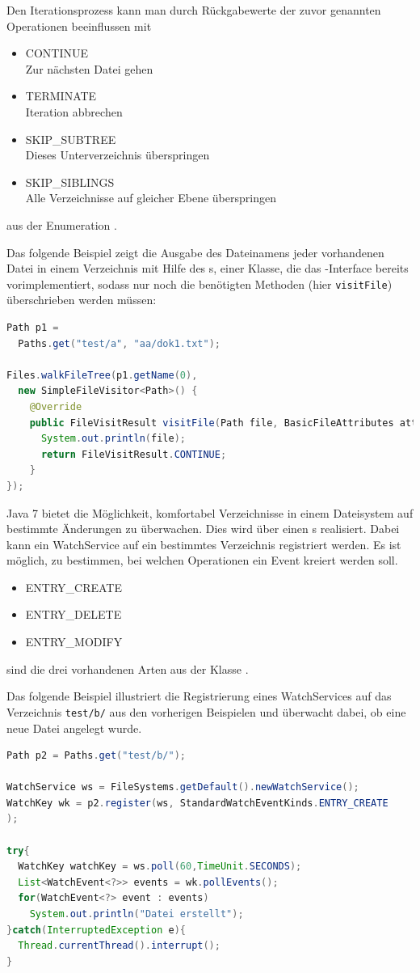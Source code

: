 \documentclass[times, 10pt,twocolumn]{article}
\begin{document}
Den Iterationsprozess kann man durch Rückgabewerte der zuvor genannten Operationen beeinflussen mit
\begin{itemize}
  \item CONTINUE\\
  Zur nächsten Datei gehen
  \item TERMINATE\\
  Iteration abbrechen
  \item SKIP\_SUBTREE\\
  Dieses Unterverzeichnis überspringen
  \item SKIP\_SIBLINGS\\
  Alle Verzeichnisse auf gleicher Ebene überspringen
\end{itemize}
aus der Enumeration .

Das folgende Beispiel zeigt die Ausgabe des Dateinamens jeder vorhandenen Datei in einem Verzeichnis mit Hilfe des
s, einer Klasse, die das -Interface bereits vorimplementiert, sodass nur noch die
benötigten Methoden (hier \texttt{visitFile}) überschrieben werden müssen:
\begin{lstlisting}[language=java,breaklines=true]
Path p1 = 
  Paths.get("test/a", "aa/dok1.txt");

Files.walkFileTree(p1.getName(0), 
  new SimpleFileVisitor<Path>() {
	@Override
	public FileVisitResult visitFile(Path file, BasicFileAttributes attrs) throws IOException {
      System.out.println(file);
      return FileVisitResult.CONTINUE;
	}
});
\end{lstlisting}

Java 7 bietet die Möglichkeit, komfortabel Verzeichnisse in einem Dateisystem auf bestimmte Änderungen zu überwachen.
Dies wird über einen s realisiert. Dabei kann ein WatchService auf ein bestimmtes Verzeichnis registriert
werden. Es ist möglich, zu bestimmen, bei welchen Operationen ein Event kreiert werden soll.
\begin{itemize}
  \item ENTRY\_CREATE
  \item ENTRY\_DELETE
  \item ENTRY\_MODIFY
\end{itemize}
sind die drei vorhandenen Arten aus der Klasse .

Das folgende Beispiel illustriert die Registrierung eines WatchServices auf das Verzeichnis \texttt{test/b/} aus den vorherigen
Beispielen und überwacht dabei, ob eine neue Datei angelegt wurde.
\begin{lstlisting}[language=java,breaklines=true]
Path p2 = Paths.get("test/b/");

WatchService ws = FileSystems.getDefault().newWatchService();
WatchKey wk = p2.register(ws, StandardWatchEventKinds.ENTRY_CREATE
);

try{
  WatchKey watchKey = ws.poll(60,TimeUnit.SECONDS);
  List<WatchEvent<?>> events = wk.pollEvents();
  for(WatchEvent<?> event : events)
    System.out.println("Datei erstellt");
}catch(InterruptedException e){
  Thread.currentThread().interrupt();
}
\end{lstlisting}
\end{document}

